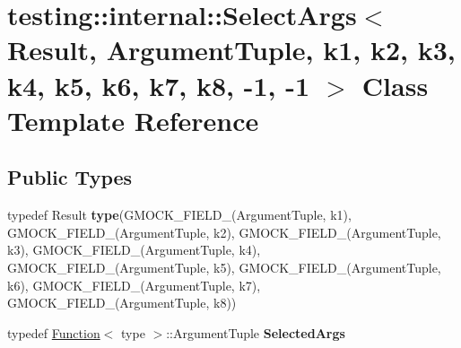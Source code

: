 \hypertarget{classtesting_1_1internal_1_1SelectArgs_3_01Result_00_01ArgumentTuple_00_01k1_00_01k2_00_01k3_00_5bf9522b4f7bab9048d7587f1d9fbf27}{}\section{testing\+:\+:internal\+:\+:Select\+Args$<$ Result, Argument\+Tuple, k1, k2, k3, k4, k5, k6, k7, k8, -\/1, -\/1 $>$ Class Template Reference}
\label{classtesting_1_1internal_1_1SelectArgs_3_01Result_00_01ArgumentTuple_00_01k1_00_01k2_00_01k3_00_5bf9522b4f7bab9048d7587f1d9fbf27}
\subsection*{Public Types}
\begin{DoxyCompactItemize}
\item 
\mbox{\label{classtesting_1_1internal_1_1SelectArgs_3_01Result_00_01ArgumentTuple_00_01k1_00_01k2_00_01k3_00_5bf9522b4f7bab9048d7587f1d9fbf27_a098037b4b2ed4c33121d2e0f1967acbf}} 
typedef Result {\bfseries type}(G\+M\+O\+C\+K\+\_\+\+F\+I\+E\+L\+D\+\_\+(Argument\+Tuple, k1), G\+M\+O\+C\+K\+\_\+\+F\+I\+E\+L\+D\+\_\+(Argument\+Tuple, k2), G\+M\+O\+C\+K\+\_\+\+F\+I\+E\+L\+D\+\_\+(Argument\+Tuple, k3), G\+M\+O\+C\+K\+\_\+\+F\+I\+E\+L\+D\+\_\+(Argument\+Tuple, k4), G\+M\+O\+C\+K\+\_\+\+F\+I\+E\+L\+D\+\_\+(Argument\+Tuple, k5), G\+M\+O\+C\+K\+\_\+\+F\+I\+E\+L\+D\+\_\+(Argument\+Tuple, k6), G\+M\+O\+C\+K\+\_\+\+F\+I\+E\+L\+D\+\_\+(Argument\+Tuple, k7), G\+M\+O\+C\+K\+\_\+\+F\+I\+E\+L\+D\+\_\+(Argument\+Tuple, k8))
\item 
\mbox{\label{classtesting_1_1internal_1_1SelectArgs_3_01Result_00_01ArgumentTuple_00_01k1_00_01k2_00_01k3_00_5bf9522b4f7bab9048d7587f1d9fbf27_a964de7fbb2ffb6acf0d7d80528cda6ba}} 
typedef \hyperlink{structtesting_1_1internal_1_1Function}{Function}$<$ type $>$\+::Argument\+Tuple {\bfseries Selected\+Args}
\end{DoxyCompactItemize}

